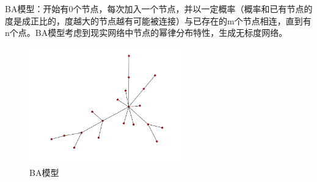 \begin{frame}
	BA模型：开始有0个节点，每次加入一个节点，并以一定概率（概率和已有节点的度是成正比的，度越大的节点越有可能被连接）与已存在的m个节点相连，直到有n个点。BA模型考虑到现实网络中节点的幂律分布特性，生成无标度网络。
	\begin{figure}[htbp]
		\centering
		\includegraphics[width=0.6\textwidth]{pic/BA.png}
		\caption{BA模型}
	\end{figure}
\end{frame}